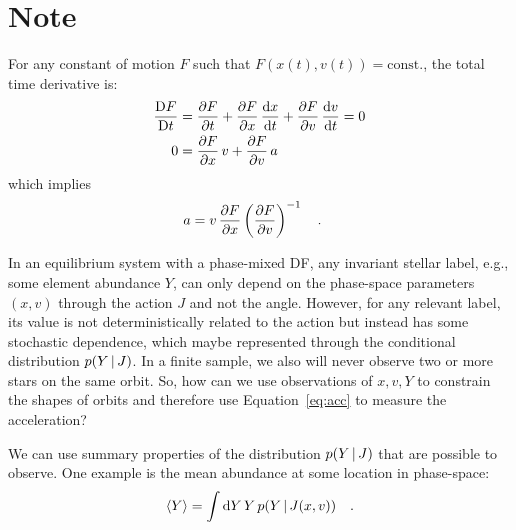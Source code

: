 \documentclass{article}
\begin{document}
\section{Note}

For any constant of motion $F$ such that $F(x(t), v(t)) = \textrm{const.}$, the total time derivative is:
\begin{align}
    \frac{\mathrm{D}{F}}{\mathrm{D}{t}} &= \frac{\partial {F}}{\partial {t}} +
        \frac{\partial {F}}{\partial {x}} \, \frac{\mathrm{d}{x}}{\mathrm{d}{t}} + \frac{\partial {F}}{\partial {v}} \, \frac{\mathrm{d}{v}}{\mathrm{d}{t}} = 0 \\
    0 &= \frac{\partial {F}}{\partial {x}} \, v + \frac{\partial {F}}{\partial {v}} \, a
\end{align}
which implies
\begin{align}
    a &= v \, \frac{\partial {F}}{\partial {x}} \left(\frac{\partial {F}}{\partial {v}}\right)^{-1} \quad . \label{eq:acc}
\end{align}

In an equilibrium system with a phase-mixed DF, any invariant stellar label, e.g., some
element abundance $Y$, can only depend on the phase-space parameters $(x, v)$ through
the action $J$ and not the angle.
However, for any relevant label, its value is not deterministically related to the
action but instead has some stochastic dependence, which maybe represented through the
conditional distribution $p(Y \,|\, J)$.
In a finite sample, we also will never observe two or more stars on the same orbit.
So, how can we use observations of $x, v, Y$ to constrain the shapes of orbits and
therefore use Equation~\ref{eq:acc} to measure the acceleration?

We can use summary properties of the distribution $p(Y \,|\, J)$ that are possible to
observe.
One example is the mean abundance at some location in phase-space:
\begin{equation}
    \left< Y \right> = \int \mathrm{d} Y \, Y \, p(Y \,|\, J(x, v)) \quad .
\end{equation}
\end{document}
